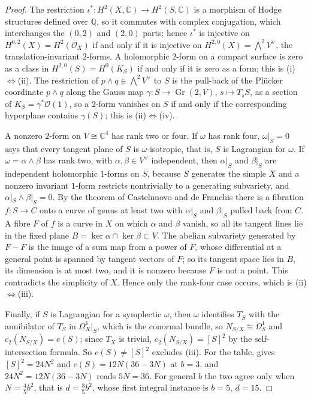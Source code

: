 \documentclass[11pt,reqno]{amsart}
\theoremstyle{plain}
\theoremstyle{definition}
\theoremstyle{remark}
\newcommand{\QQ}{\mathbb{Q}}
\newcommand{\CC}{\mathbb{C}}
\newcommand{\cO}{\mathcal{O}}
\begin{document}
\begin{proof}
The restriction $\iota^{*}\colon H^{2}(X,\CC)\to H^{2}(S,\CC)$ is a morphism
of Hodge structures defined over $\QQ$, so it commutes with complex
conjugation, which interchanges the $(0,2)$ and $(2,0)$ parts; hence
$\iota^{*}$ is injective on $H^{0,2}(X)=H^{2}(\cO_{X})$ if and only if it is
injective on $H^{2,0}(X)=\bigwedge^{2}V^{\vee}$, the translation-invariant
$2$-forms. A holomorphic $2$-form on a compact surface is zero as a class in
$H^{2,0}(S)=H^{0}(K_{S})$ if and only if it is zero as a form; this is
(i)$\Leftrightarrow$(ii). The restriction of $p\wedge q\in\bigwedge^{2}V^{\vee}$
to $S$ is the pull-back of the Pl\"ucker coordinate $p\wedge q$ along the
Gauss map $\gamma\colon S\to\operatorname{Gr}(2,V)$, $s\mapsto T_{s}S$, as a
section of $K_{S}=\gamma^{*}\cO(1)$, so a $2$-form vanishes on $S$ if and
only if the corresponding hyperplane contains $\gamma(S)$; this is
(ii)$\Leftrightarrow$(iv).

A nonzero $2$-form on $V\cong\CC^{4}$ has rank two or four. If $\omega$ has
rank four, $\omega|_{S}=0$ says that every tangent plane of $S$ is
$\omega$-isotropic, that is, $S$ is Lagrangian for $\omega$. If
$\omega=\alpha\wedge\beta$ has rank two, with $\alpha,\beta\in V^{\vee}$
independent, then $\alpha|_{S}$ and $\beta|_{S}$ are independent
holomorphic $1$-forms on $S$, because $S$ generates the simple $X$ and a nonzero
invariant $1$-form restricts nontrivially to a generating subvariety, and
$\alpha|_{S}\wedge\beta|_{S}=0$. By the theorem of Castelnuovo and de
Franchis \cite{BHPV04} there is a fibration
$f\colon S\to C$ onto a curve of genus at least two with $\alpha|_{S}$ and
$\beta|_{S}$ pulled back from $C$. A fibre $F$ of $f$ is a curve in $X$ on
which $\alpha$ and $\beta$ vanish, so all its tangent lines lie in the fixed
plane $B=\ker\alpha\cap\ker\beta\subset V$. The abelian subvariety generated
by $F-F$ is the image of a sum map from a power of $F$, whose differential at
a general point is spanned by tangent vectors of $F$; so its tangent space
lies in $B$, its dimension is at most two, and it is nonzero because $F$ is
not a point. This contradicts the simplicity of $X$. Hence only the
rank-four case occurs, which is (ii)$\Leftrightarrow$(iii).

Finally, if $S$ is Lagrangian for a symplectic $\omega$, then $\omega$
identifies $T_{S}$ with the annihilator of $T_{S}$ in $\Omega^{1}_{X}|_{S}$,
which is the conormal bundle, so $N_{S/X}\cong\Omega^{1}_{S}$ and
$c_{2}(N_{S/X})=e(S)$; since $T_{X}$ is trivial, $c_{2}(N_{S/X})=[S]^{2}$ by
the self-intersection formula. So $e(S)\ne[S]^{2}$ excludes (iii). For the
table,  gives $[S]^{2}=24N^{2}$ and
$e(S)=12N(36-3N)$ at $b=3$, and $24N^{2}=12N(36-3N)$ reads $5N=36$. For
general $b$ the two agree only when $N=\tfrac45b^{2}$, that is
$d=\tfrac35b^{2}$, whose first integral instance is $b=5$, $d=15$.
\end{proof}
\end{document}
